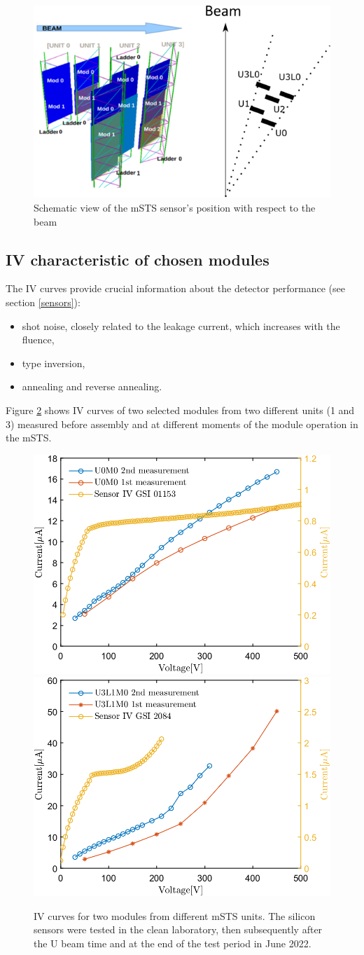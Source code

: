 \begin{figure}[!h]
\centering
\includegraphics[width=0.75\columnwidth]{Chapter6/DCS/images/msts_sensors_scheme2.png}
\caption{Schematic view of the \gls{mSTS} sensor's position with respect to the beam}
\label{fig_sensors_scheme}
\end{figure}
\newpage
\subsection{IV characteristic of chosen modules}
The IV curves provide crucial information about the detector performance (see section \ref{sensors}):
\begin{itemize}
    \item shot noise, closely related to the leakage current, which increases with the fluence,
    \item type inversion,
    \item annealing and reverse annealing.
\end{itemize}
Figure \ref{fig_IV} shows IV curves of two selected modules from two different units (1 and 3) measured before assembly and at different moments of the module operation in the \gls{mSTS}.
\begin{figure}[!h]
\centering
\includegraphics[width=0.47\columnwidth]{Chapter6/DCS/images/IV/U0FEB1.png}
\includegraphics[width=0.47\columnwidth]{Chapter6/DCS/images/IV/U3L1FEB1.png}
\caption{IV curves for two modules from different \gls{mSTS} units. The silicon sensors were tested in the clean laboratory, then subsequently after the U beam time and at the end of the test period in June 2022.}
\label{fig_IV}
\end{figure}

